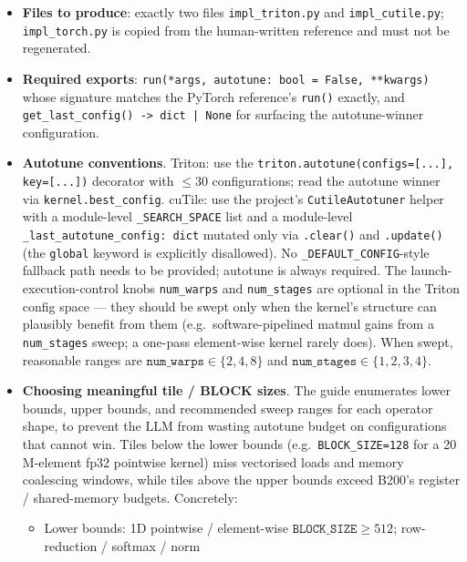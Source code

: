\documentclass[11pt]{article}
\begin{document}
\begin{itemize}[leftmargin=*]
    \item \textbf{Files to produce}: exactly two files
    \texttt{impl\_triton.py} and \texttt{impl\_cutile.py};
    \texttt{impl\_torch.py} is copied from the human-written reference
    and must not be regenerated.
    \item \textbf{Required exports}: \texttt{run(*args, autotune: bool =
    False, **kwargs)} whose signature matches the PyTorch reference's
    \texttt{run()} exactly, and \texttt{get\_last\_config() -> dict |
    None} for surfacing the autotune-winner configuration.
    \item \textbf{Autotune conventions}. Triton: use the
    \texttt{triton.autotune(configs=[...], key=[...])} decorator with
    $\leq 30$ configurations; read the autotune winner via
    \texttt{kernel.best\_config}. cuTile: use the project's
    \texttt{CutileAutotuner} helper with a module-level
    \texttt{\_SEARCH\_SPACE} list and a module-level
    \texttt{\_last\_autotune\_config: dict} mutated only via
    \texttt{.clear()} and \texttt{.update()} (the \texttt{global}
    keyword is explicitly disallowed). No
    \texttt{\_DEFAULT\_CONFIG}-style fallback path needs to be
    provided; autotune is always required. The launch-execution-control
    knobs \texttt{num\_warps} and \texttt{num\_stages} are optional in
    the Triton config space --- they should be swept only when the
    kernel's structure can plausibly benefit from them (e.g.\
    software-pipelined matmul gains from a \texttt{num\_stages} sweep;
    a one-pass element-wise kernel rarely does). When swept, reasonable
    ranges are $\texttt{num\_warps} \in \{2, 4, 8\}$ and
    $\texttt{num\_stages} \in \{1, 2, 3, 4\}$.
    \item \textbf{Choosing meaningful tile / BLOCK sizes}. The guide
    enumerates lower bounds, upper bounds, and recommended sweep ranges
    for each operator shape, to prevent the LLM from wasting autotune
    budget on configurations that cannot win. Tiles below the lower
    bounds (e.g.\ \texttt{BLOCK\_SIZE=128} for a 20\,M-element fp32
    pointwise kernel) miss vectorised loads and memory coalescing
    windows, while tiles above the upper bounds exceed B200's
    register / shared-memory budgets. Concretely:
    \begin{itemize}[leftmargin=*, itemsep=2pt]
        \item Lower bounds: 1D pointwise / element-wise
        $\texttt{BLOCK\_SIZE} \geq 512$; row-reduction / softmax / norm

\end{itemize}
\end{itemize}
\end{document}
